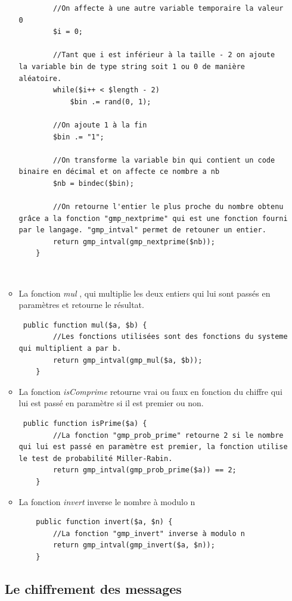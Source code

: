 \documentclass[12pt,a4paper]{report}
\begin{document}
\begin{itemize}
\begin{itemize}
\begin{lstlisting}
        //On affecte à une autre variable temporaire la valeur 0
        $i = 0;
        
        //Tant que i est inférieur à la taille - 2 on ajoute  la variable bin de type string soit 1 ou 0 de manière aléatoire.
        while($i++ < $length - 2)
            $bin .= rand(0, 1);
        
        //On ajoute 1 à la fin
        $bin .= "1";
        
        //On transforme la variable bin qui contient un code binaire en décimal et on affecte ce nombre a nb
        $nb = bindec($bin);
        
        //On retourne l'entier le plus proche du nombre obtenu grâce a la fonction "gmp_nextprime" qui est une fonction fourni par le langage. "gmp_intval" permet de retouner un entier.
        return gmp_intval(gmp_nextprime($nb));
    }
\end{lstlisting}
$ $\item La fonction \textit{mul} , qui multiplie les deux entiers qui lui sont passés en paramètres et retourne le résultat.
\begin{lstlisting}
 public function mul($a, $b) {
        //Les fonctions utilisées sont des fonctions du systeme qui multiplient a par b.
        return gmp_intval(gmp_mul($a, $b));
    }
\end{lstlisting}
\item La fonction \textit{isComprime} retourne vrai ou faux en fonction du chiffre qui lui est passé en paramètre si il est premier ou non.
\begin{lstlisting}
 public function isPrime($a) {
        //La fonction "gmp_prob_prime" retourne 2 si le nombre qui lui est passé en paramètre est premier, la fonction utilise le test de probabilité Miller-Rabin.
        return gmp_intval(gmp_prob_prime($a)) == 2;
    }
\end{lstlisting}
\item La fonction \textit{invert} inverse le nombre à modulo n
\begin{lstlisting}
    public function invert($a, $n) {
        //La fonction "gmp_invert" inverse à modulo n
        return gmp_intval(gmp_invert($a, $n));
    }
\end{lstlisting}
\end{itemize}

\subsection{Le chiffrement des messages}

\end{itemize}
\end{document}
